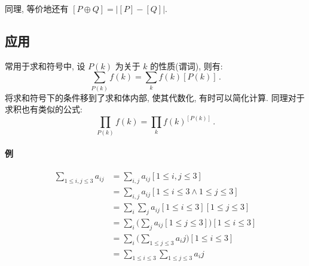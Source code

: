 \documentclass[UTF8]{ctexart}
\begin{document}
同理, 等价地还有 $ [P \oplus Q] = \big| [P] - [Q] \big| $.

\subsection*{应用}
常用于求和符号中, 设 $ P(k) $ 为关于 $ k $ 的性质(谓词), 则有:
\[ 
    \sum_{P(k)} f(k) = \sum_{k} f(k)[P(k)] \,.
\]
将求和符号下的条件移到了求和体内部, 使其代数化, 有时可以简化计算. 同理对于求积也有类似的公式:
\[ 
    \prod_{P(k)} f(k) = \prod_{k} f(k)^{[P(k)]} \,.
\]
\paragraph{例}
\begin{align*}
    \sum_{1 \leqslant i, j \leqslant 3} a_{ij} &= \sum_{i, j} a_{ij} [1 \leqslant i, j \leqslant 3] \\
    &= \sum_{i, j} a_{ij} [1 \leqslant i \leqslant 3 \land 1 \leqslant j \leqslant 3] \\
    &= \sum_i \sum_j a_{ij} [1 \leqslant i \leqslant 3] [1 \leqslant j \leqslant 3] \\
    &= \sum_i \Big( \sum_j a_{ij} [1 \leqslant j \leqslant 3] \Big) [1 \leqslant i \leqslant 3] \\
    &= \sum_i \Big( \sum_{1 \leqslant j \leqslant 3} a_ij \Big) [1 \leqslant i \leqslant 3] \\
    &= \sum_{1 \leqslant i \leqslant 3} \sum_{1 \leqslant j \leqslant 3} a_ij
\end{align*}
\end{document}

